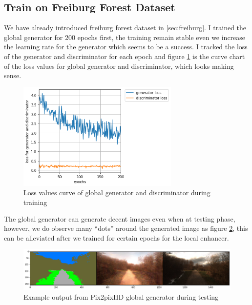 \subsection{Train on Freiburg Forest Dataset}
We have already introduced freiburg forest dataset in \ref{sec:freiburg}. I trained the 
global generator for 200 epochs first, the training remain stable even we increase the 
learning rate for the generator which seems to be a success. I tracked the loss of the 
generator and discriminator for each epoch and figure \ref{fig:global-generator-loss} is the 
curve chart of the loss values for global generator and discriminator, which looks 
making sense. 
\begin{figure}[H]
    \begin{center}
    \includegraphics[width=8cm]{figures/global-generator-loss}
    \end{center}
    \caption{Loss values curve of global generator and discriminator during training}
    \label{fig:global-generator-loss}
\end{figure}
The global generator can generate decent images even when at testing phase, however,
we do observe many “dots” around the generated image as figure \ref{fig:global-generator-output}, 
this can be alleviated after 
we trained for certain epochs for the local enhancer.
\begin{figure}[H]
    \begin{center}
    \includegraphics[width=14cm]{figures/global-generator-output}
    \end{center}
    \caption{Example output from Pix2pixHD global generator during testing}
    \label{fig:global-generator-output}
\end{figure}

